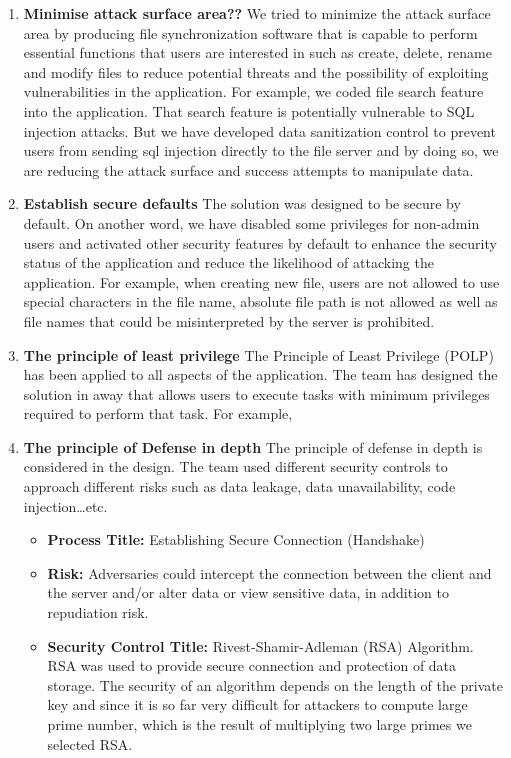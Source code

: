 \documentclass{article}
\begin{document}
\begin{enumerate}
\item \textbf{Minimise attack surface area??}
We tried to minimize the attack surface area by producing file synchronization software that is capable to perform essential functions that users are interested in  such as create, delete, rename and modify files to reduce potential threats and the possibility of exploiting vulnerabilities in the application.
For example, we coded file search feature into the application. That search feature is potentially vulnerable to SQL injection attacks. But we have developed data sanitization control to prevent users from sending sql injection directly to the file server and by doing so, we are reducing the attack surface and success attempts to manipulate data.
\item \textbf{Establish secure defaults}
The solution was designed to be secure by default. On another word, we have disabled some privileges for non-admin users and activated other security features by default to enhance the security status of the application and reduce the likelihood of attacking the application. For example, when creating new file, users are not allowed to use special characters in the file name, absolute file path is not allowed as well as file names that could be misinterpreted by the server is prohibited.
\item \textbf{The principle of least privilege}
The Principle of Least Privilege (POLP) has been applied to all aspects of the application. The team has designed the solution in away that allows users to execute tasks with minimum privileges required to perform that task.
For example,
\item \textbf{The principle of Defense in depth}
The principle of defense in depth is considered in the design. The team used different security controls to approach different risks such as data leakage, data unavailability, code injection…etc.
\begin{itemize}
\item \textbf{Process Title:} Establishing Secure Connection (Handshake)
\item \textbf{Risk:} Adversaries could intercept the connection between the client and the server and/or alter data or view sensitive data, in addition to repudiation risk.
\item \textbf{Security Control Title:} Rivest-Shamir-Adleman (RSA) Algorithm. RSA was used to provide secure connection and protection of data storage. The security of an algorithm depends on the length of the private key and since it is so far very difficult for attackers to compute large prime number, which is the result of multiplying two large primes we selected RSA.


\end{itemize}
\end{enumerate}
\end{document}
